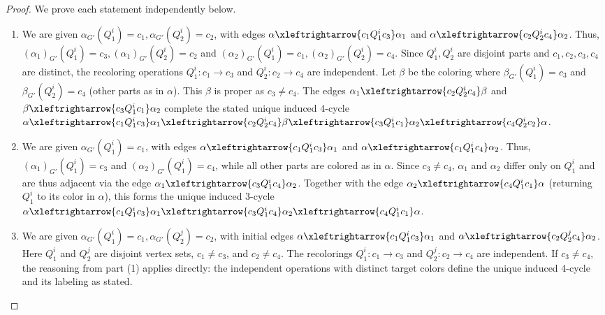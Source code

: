 \documentclass{amsart}
\theoremstyle{hypothesisstyle}
\theoremstyle{definition}
\theoremstyle{remark}
\numberwithin{equation}{section}
\begin{document}
\begin{proof}
We prove each statement independently below.
\begin{enumerate}
    \item We are given $\alpha_{G'}(Q^i_1)=c_1, \alpha_{G'}(Q^i_2)=c_2$, with edges $\alpha \xleftrightarrow{c_1Q^i_1c_3} \alpha_1$ and $\alpha \xleftrightarrow{c_2Q^i_2c_4} \alpha_2$. Thus, $(\alpha_1)_{G'}(Q^i_1)=c_3, (\alpha_1)_{G'}(Q^i_2)=c_2$ and $(\alpha_2)_{G'}(Q^i_1)=c_1, (\alpha_2)_{G'}(Q^i_2)=c_4$.
    Since $Q^i_1, Q^i_2$ are disjoint parts and $c_1,c_2,c_3,c_4$ are distinct, the recoloring operations $Q^i_1\colon c_1 \to c_3$ and $Q^i_2\colon c_2 \to c_4$ are independent. Let $\beta$ be the coloring where $\beta_{G'}(Q^i_1)=c_3$ and $\beta_{G'}(Q^i_2)=c_4$ (other parts as in $\alpha$). This $\beta$ is proper as $c_3 \neq c_4$. The edges $\alpha_1 \xleftrightarrow{c_2Q^i_2c_4} \beta$ and $\beta \xleftrightarrow{c_3Q^i_1c_1} \alpha_2$ complete the stated unique induced $4$-cycle $\alpha \xleftrightarrow{c_1Q^i_1c_3} \alpha_1 \xleftrightarrow{c_2Q^i_2c_4} \beta \xleftrightarrow{c_3Q^i_1c_1} \alpha_2 \xleftrightarrow{c_4Q^i_2c_2} \alpha$.
    \item  We are given $\alpha_{G'}(Q^i_1)=c_1$, with edges $\alpha \xleftrightarrow{c_1Q^i_1c_3} \alpha_1$ and $\alpha \xleftrightarrow{c_1Q^i_1c_4} \alpha_2$. Thus, $(\alpha_1)_{G'}(Q^i_1)=c_3$ and $(\alpha_2)_{G'}(Q^i_1)=c_4$, while all other parts are colored as in $\alpha$. Since $c_3 \neq c_4$, $\alpha_1$ and $\alpha_2$ differ only on $Q^i_1$ and are thus adjacent via the edge $\alpha_1 \xleftrightarrow{c_3Q^i_1c_4} \alpha_2$. Together with the edge $\alpha_2 \xleftrightarrow{c_4Q^i_1c_1} \alpha$ (returning $Q^i_1$ to its color in $\alpha$), this forms the unique induced $3$-cycle $\alpha \xleftrightarrow{c_1Q^i_1c_3} \alpha_1 \xleftrightarrow{c_3Q^i_1c_4} \alpha_2 \xleftrightarrow{c_4Q^i_1c_1} \alpha$.
    \item We are given $\alpha_{G'}(Q^i_1)=c_1, \alpha_{G'}(Q^j_2)=c_2$, with initial edges $\alpha \xleftrightarrow{c_1Q^i_1c_3} \alpha_1$ and $\alpha \xleftrightarrow{c_2Q^j_2c_4} \alpha_2$. Here $Q^i_1$ and $Q^j_2$ are disjoint vertex sets, $c_1 \neq c_3$, and $c_2 \neq c_4$. The recolorings $Q^i_1\colon c_1 \to c_3$ and $Q^j_2\colon c_2 \to c_4$ are independent. If $c_3 \neq c_4$, the reasoning from part (1) applies directly: the independent operations with distinct target colors define the unique induced 4-cycle and its labeling as stated.
    

\end{enumerate}
\end{proof}
\end{document}
